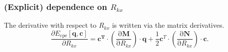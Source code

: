 \documentclass{article}
\numberwithin{equation}{section}
\begin{document}
\subsubsection{(Explicit) dependence on $R_{kx}$}
The derivative with respect to $R_{kx}$ is written via the matrix derivatives.
\begin{equation}
    \frac{\partial E_\mathrm{{cpe}}\left[\mathbf{q}, \mathbf{c}\right]}{\partial R_{kx}} = 
    \mathbf{c^T} \cdot \left( \frac{\mathrm{\partial}\mathbf{M}}{\mathrm{\partial}R_{kx}}\right) \cdot \mathbf{q} 
    + \frac{1}{2}\mathbf{c}^T \cdot \left( \frac{\mathrm{\partial}\mathbf{N}}{\mathrm{\partial}R_{kx}}\right) \cdot \mathbf{c}. 
\end{equation}
\end{document}
